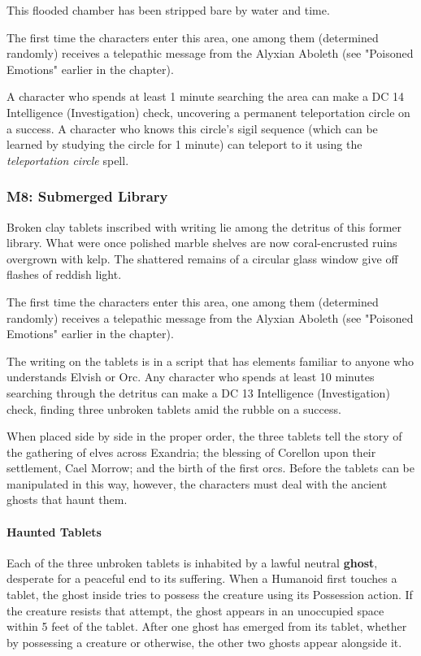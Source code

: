 \documentclass[a4paper, 11pt, bg=full, twocolumn, nooutline]{dndbook}
\begin{document}
This flooded chamber has been stripped bare by water and time.

The first time the characters enter this area, one among them (determined randomly) receives a telepathic message from the Alyxian Aboleth (see "Poisoned Emotions" earlier in the chapter).

A character who spends at least 1 minute searching the area can make a DC 14 Intelligence (Investigation) check, uncovering a permanent teleportation circle on a success. A character who knows this circle's sigil sequence (which can be learned by studying the circle for 1 minute) can teleport to it using the \textit{teleportation circle} spell.

\subsubsection{M8: Submerged Library}

\begin{DndReadAloud}
Broken clay tablets inscribed with writing lie among the detritus of this former library. What were once polished marble shelves are now coral-encrusted ruins overgrown with kelp. The shattered remains of a circular glass window give off flashes of reddish light.
\end{DndReadAloud}

The first time the characters enter this area, one among them (determined randomly) receives a telepathic message from the Alyxian Aboleth (see "Poisoned Emotions" earlier in the chapter).

The writing on the tablets is in a script that has elements familiar to anyone who understands Elvish or Orc. Any character who spends at least 10 minutes searching through the detritus can make a DC 13 Intelligence (Investigation) check, finding three unbroken tablets amid the rubble on a success.

When placed side by side in the proper order, the three tablets tell the story of the gathering of elves across Exandria; the blessing of Corellon upon their settlement, Cael Morrow; and the birth of the first orcs. Before the tablets can be manipulated in this way, however, the characters must deal with the ancient ghosts that haunt them.

\paragraph{Haunted Tablets}

Each of the three unbroken tablets is inhabited by a lawful neutral \textbf{ghost}, desperate for a peaceful end to its suffering. When a Humanoid first touches a tablet, the ghost inside tries to possess the creature using its Possession action. If the creature resists that attempt, the ghost appears in an unoccupied space within 5 feet of the tablet. After one ghost has emerged from its tablet, whether by possessing a creature or otherwise, the other two ghosts appear alongside it.
\end{document}
